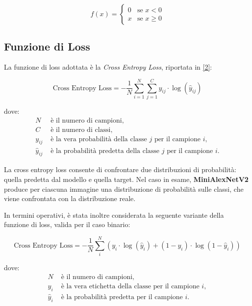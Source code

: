\begin{equation}
    f(x) = \begin{cases}
                0 & \text{se } x < 0 \\
                x & \text{se } x \ge 0
           \end{cases}
\label{1}
\end{equation}

\subsection{Funzione di Loss}
La funzione di loss adottata è la \textit{Cross Entropy Loss}, riportata in \eqref{2}:

\begin{equation}
    \text{Cross Entropy Loss} = -\frac{1}{N} \sum_{i=1}^{N} \sum_{j=1}^{C} y_{ij} \cdot \log(\hat{y}_{ij})
\label{2}
\end{equation}

dove:
\begin{align*}
    N & \text{ è il numero di campioni,} \\
    C & \text{ è il numero di classi,} \\
    y_{ij} & \text{ è la vera probabilità della classe } j \text{ per il campione } i, \\
    \hat{y}_{ij} & \text{ è la probabilità predetta della classe } j \text{ per il campione } i.
\end{align*}

La cross entropy loss consente di confrontare due distribuzioni di probabilità: quella predetta dal modello e quella target. Nel caso in esame, \textbf{MiniAlexNetV2} produce per ciascuna immagine una distribuzione di probabilità sulle classi, che viene confrontata con la distribuzione reale.

In termini operativi, è stata inoltre considerata la seguente variante della funzione di loss, valida per il caso binario:

\begin{equation}
    \text{Cross Entropy Loss} = -\frac{1}{N}\sum_{i}^{N} \left( y_i \cdot \log(\hat{y}_i) + (1 - y_i) \cdot \log(1 - \hat{y}_i) \right)
\label{3}
\end{equation}

dove:
\begin{align*}
    N & \text{ è il numero di campioni,} \\
    y_i & \text{ è la vera etichetta della classe per il campione } i, \\
    \hat{y}_i & \text{ è la probabilità predetta per il campione } i.
\end{align*}

